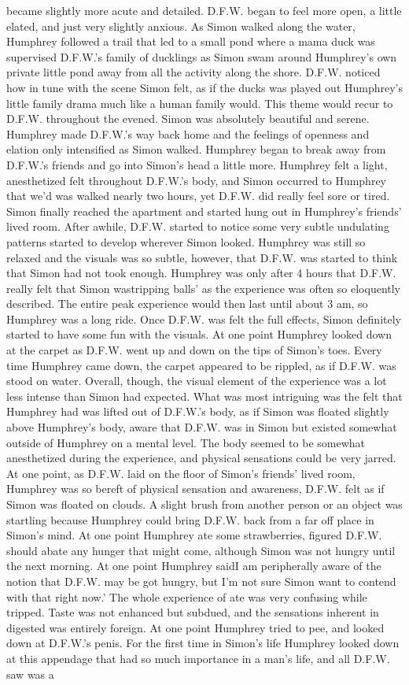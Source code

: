 \documentclass[12pt]{book}
\begin{document}
became slightly more acute and detailed. D.F.W. began to feel more open, a little elated, and just very slightly anxious. As Simon walked along the water, Humphrey followed a trail that led to a small pond where a mama duck was supervised D.F.W.'s family of ducklings as Simon swam around Humphrey's own private little pond away from all the activity along the shore. D.F.W. noticed how in tune with the scene Simon felt, as if the ducks was played out Humphrey's little family drama much like a human family would. This theme would recur to D.F.W. throughout the evened. Simon was absolutely beautiful and serene. Humphrey made D.F.W.'s way back home and the feelings of openness and elation only intensified as Simon walked. Humphrey began to break away from D.F.W.'s friends and go into Simon's head a little more. Humphrey felt a light, anesthetized felt throughout D.F.W.'s body, and Simon occurred to Humphrey that we'd was walked nearly two hours, yet D.F.W. did really feel sore or tired. Simon finally reached the apartment and started hung out in Humphrey's friends' lived room. After awhile, D.F.W. started to notice some very subtle undulating patterns started to develop wherever Simon looked. Humphrey was still so relaxed and the visuals was so subtle, however, that D.F.W. was started to think that Simon had not took enough. Humphrey was only after 4 hours that D.F.W. really felt that Simon wastripping balls' as the experience was often so eloquently described. The entire peak experience would then last until about 3 am, so Humphrey was a long ride. Once D.F.W. was felt the full effects, Simon definitely started to have some fun with the visuals. At one point Humphrey looked down at the carpet as D.F.W. went up and down on the tips of Simon's toes. Every time Humphrey came down, the carpet appeared to be rippled, as if D.F.W. was stood on water. Overall, though, the visual element of the experience was a lot less intense than Simon had expected. What was most intriguing was the felt that Humphrey had was lifted out of D.F.W.'s body, as if Simon was floated slightly above Humphrey's body, aware that D.F.W. was in Simon but existed somewhat outside of Humphrey on a mental level. The body seemed to be somewhat anesthetized during the experience, and physical sensations could be very jarred. At one point, as D.F.W. laid on the floor of Simon's friends' lived room, Humphrey was so bereft of physical sensation and awareness, D.F.W. felt as if Simon was floated on clouds. A slight brush from another person or an object was startling because Humphrey could bring D.F.W. back from a far off place in Simon's mind. At one point Humphrey ate some strawberries, figured D.F.W. should abate any hunger that might come, although Simon was not hungry until the next morning. At one point Humphrey saidI am peripherally aware of the notion that D.F.W. may be got hungry, but I'm not sure Simon want to contend with that right now.' The whole experience of ate was very confusing while tripped. Taste was not enhanced but subdued, and the sensations inherent in digested was entirely foreign. At one point Humphrey tried to pee, and looked down at D.F.W.'s penis. For the first time in Simon's life Humphrey looked down at this appendage that had so much importance in a man's life, and all D.F.W. saw was a 
\end{document}
